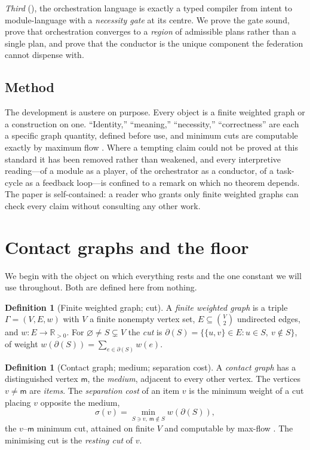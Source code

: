 \documentclass[twocolumn,11pt,a4paper]{article}
\theoremstyle{sup}
\theoremstyle{definition}
\newtheorem{definition}[theorem]{Definition}
\theoremstyle{remark}
\newcommand{\R}{\mathbb{R}}
\newcommand{\E}{E}                    %
\newcommand{\med}{\mathsf{m}}         %
\newcommand{\cut}{\partial}
\newcommand{\str}{\sigma}             %
\newcommand{\set}[1]{\{#1\}}
\begin{document}
\emph{Third} (), the orchestration
language is exactly a typed compiler from intent to module-language with a
\emph{necessity gate} at its centre. We prove the gate sound, prove that
orchestration converges to a \emph{region} of admissible plans rather than a
single plan, and prove that the conductor is the unique component the federation
cannot dispense with.

\subsection{Method}

The development is austere on purpose. Every object is a finite weighted graph or
a construction on one. ``Identity,'' ``meaning,'' ``necessity,'' ``correctness''
are each a specific graph quantity, defined before use, and minimum cuts are
computable exactly by maximum flow \citep{fordfulkerson1956,menger1927}. Where a
tempting claim could not be proved at this standard it has been removed rather
than weakened, and every interpretive reading---of a module as a player, of the
orchestrator as a conductor, of a task-cycle as a feedback loop---is confined to a
remark on which no theorem depends. The paper is self-contained: a reader who
grants only finite weighted graphs can check every claim without consulting any
other work.

\section{Contact graphs and the floor}
\label{sec:floor}

We begin with the object on which everything rests and the one constant we will
use throughout. Both are defined here from nothing.

\begin{definition}[Finite weighted graph; cut]
\label{def:graph}
A \emph{finite weighted graph} is a triple $\Gamma=(V,\E,w)$ with $V$ a finite
nonempty vertex set, $\E\subseteq\binom{V}{2}$ undirected edges, and
$w\colon\E\to\R_{>0}$. For $\varnothing\neq S\subsetneq V$ the \emph{cut} is
$\cut(S)=\set{\set{u,v}\in\E:u\in S,\ v\notin S}$, of weight
$w(\cut(S))=\sum_{e\in\cut(S)}w(e)$.
\end{definition}

\begin{definition}[Contact graph; medium; separation cost]
\label{def:contact}
A \emph{contact graph} has a distinguished vertex $\med$, the \emph{medium},
adjacent to every other vertex. The vertices $v\neq\med$ are \emph{items}. The
\emph{separation cost} of an item $v$ is the minimum weight of a cut placing $v$
opposite the medium,
\[
\str(v)=\min_{S\ni v,\ \med\notin S}w(\cut(S)),
\]
the $v$--$\med$ minimum cut, attained on finite $V$ and computable by max-flow
\citep{fordfulkerson1956,menger1927,diestel2017}. The minimising cut is the
\emph{resting cut} of $v$.
\end{definition}
\end{document}
